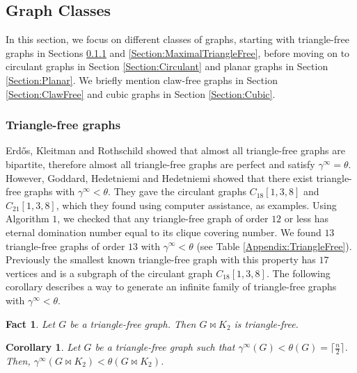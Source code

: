 \documentclass[11pt]{article}
\newtheorem{fact}[thm]{Fact}
\newtheorem{cor}[thm]{Corollary}
\begin{document}

	\newpage
	\subsection{Graph Classes} \label{Section:GraphClasses}
	In this section, we focus on different classes of graphs, starting with triangle-free graphs in Sections \ref{Section:TriangleFree} and \ref{Section:MaximalTriangleFree}, before moving on to circulant graphs in Section \ref{Section:Circulant} and planar graphs in Section \ref{Section:Planar}. We briefly mention claw-free graphs in Section \ref{Section:ClawFree} and cubic graphs in Section \ref{Section:Cubic}.
	
	\subsubsection{Triangle-free graphs} \label{Section:TriangleFree}
	Erdős, Kleitman and Rothschild \cite{erdHos1976asymptotic} showed that almost all triangle-free graphs are bipartite, therefore almost all triangle-free graphs are perfect and satisfy $\gamma^\infty=\theta$. However, Goddard, Hedetniemi and Hedetniemi \cite{goddard2005eternal} showed that there exist triangle-free graphs with $\gamma^\infty<\theta$. They gave the circulant graphs $C_{18}[1, 3, 8]$ and $C_{21}[1, 3, 8]$, which they found using computer assistance, as examples. Using Algorithm $1$, we checked that any triangle-free graph of order $12$ or less has eternal domination number equal to its clique covering number. We found $13$ triangle-free graphs of order $13$ with $\gamma^\infty<\theta$ (see Table \ref{Appendix:TriangleFree}). Previously the smallest known triangle-free graph with this property has $17$ vertices and is a subgraph of the circulant graph $C_{18}[1, 3, 8]$. The following corollary describes a way to generate an infinite family of triangle-free graphs with $\gamma^\infty<\theta$.
	
	\begin{fact} \label{Fact:BowtieTriangleFree}
		Let $G$ be a triangle-free graph. Then $G \bowtie K_2$ is triangle-free.
	\end{fact}
	
	\begin{cor} \label{Corollary:TriangleFreeInfinite}
		Let $G$ be a triangle-free graph such that $\gamma^\infty(G)<\theta(G)=\lceil \frac{n}{2} \rceil$. Then, $\gamma^\infty(G \bowtie K_2) < \theta(G \bowtie K_2)$.
	\end{cor}
\end{document}
